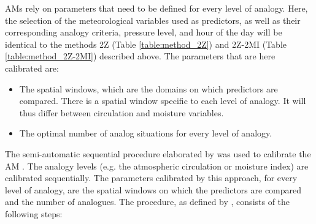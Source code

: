 \documentclass[hess, manuscript]{copernicus}
\begin{document}
	AMs rely on parameters that need to be defined for every level of analogy. Here, the selection of the meteorological variables used as predictors, as well as their corresponding analogy criteria, pressure level, and hour of the day will be identical to the methods 2Z (Table \ref{table:method_2Z}) and 2Z-2MI (Table \ref{table:method_2Z-2MI}) described above. The parameters that are here calibrated are:
	
	\begin{itemize}
		\item The spatial windows, which are the domains on which predictors are compared. There is a spatial window specific to each level of analogy. It will thus differ between circulation and moisture variables.
		\item The optimal number of analog situations for every level of analogy.
	\end{itemize}
	
	The semi-automatic sequential procedure elaborated by \citet{Bontron2004} was used to calibrate the AM \cite[see also ][]{Radanovics2013, BenDaoud2016}. The analogy levels (e.g. the atmospheric circulation or moisture index) are calibrated sequentially. The parameters calibrated by this approach, for every level of analogy, are the spatial windows on which the predictors are compared and the number of analogues. The procedure, as defined by \citet{Bontron2004}, consists of the following steps:
	
\end{document}
